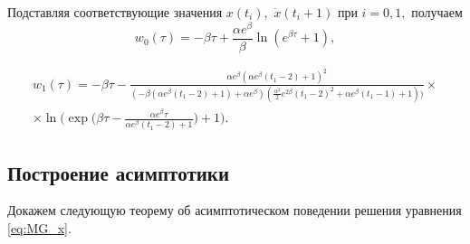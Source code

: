 Подставляя соответствующие значения $x(t_i),$ $\dot{x}(t_i + 1)$ при $i = 0, 1,$ получаем
\begin{equation}
	\label{eq:w0}
	w_0(\tau)=-\beta \tau+\frac{\alpha e^\beta}{\beta}\ln(e^{\beta\tau}+1),
\end{equation}

\small
\begin{multline}
	\label{eq:w1}
	w_1(\tau)= -\beta \tau - \frac{\alpha e^\beta(\alpha e^\beta(t_1-2)+1)^2}{(-\beta(\alpha e^\beta(t_1-2)+1)+\alpha e^\beta)(\frac{\alpha^2}{2}e^{2\beta}(t_1-2)^2+\alpha e^{\beta}(t_1-1)+1))}\times
	\\ \times\ln\Bigg(\exp\Big(\beta\tau - \frac{\alpha e^\beta\tau}{\alpha e^\beta(t_1-2)+1}\Big)+1\Bigg).
\end{multline}
\normalsize

%

\subsection{Построение асимптотики}

Докажем следующую теорему об асимптотическом поведении решения уравнения \eqref{eq:MG_x}.

